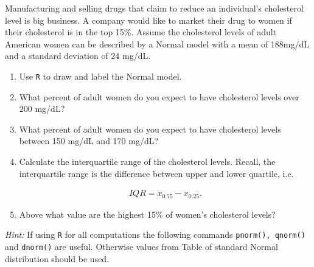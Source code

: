 
\begin{exercise}

Manufacturing and selling drugs that claim to reduce an individual's cholesterol
level is big business. A company would like to market their drug to women if their
cholesterol is in the top 15\%. Assume the cholesterol levels of adult American
women can be described by a Normal model with a mean of 188mg/dL and a standard
deviation of 24 mg/dL.

\begin{enumerate}[label = (\alph*)]
  \item Use \texttt{R} to draw and label the Normal model.
  \item What percent of adult women do you expect to have cholesterol levels over
  200 mg/dL?
  \item What percent of adult women do you expect to have cholesterol levels between
  150 mg/dL and 170 mg/dL?
  \item Calculate the interquartile range of the cholesterol levels. Recall, the
  interquartile range is the difference between upper and lower quartile, i.e.

  \begin{align*}
    IQR = x_{0.75} - x_{0.25}.
  \end{align*}
  \item Above what value are the highest 15\% of women's cholesterol levels?
\end{enumerate}

\textit{Hint:} If using \texttt{R} for all computations the following commands
\texttt{pnorm(), qnorm()} and \texttt{dnorm()} are useful. Otherwise values from
Table of standard Normal distribution should be used.
\end{exercise}


\begin{solution}

\phantom{}

\end{solution}

